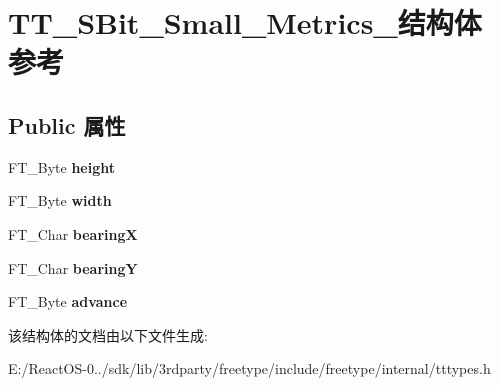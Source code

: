 \hypertarget{struct_t_t___s_bit___small___metrics__}{}\section{T\+T\+\_\+\+S\+Bit\+\_\+\+Small\+\_\+\+Metrics\+\_\+结构体 参考}
\label{struct_t_t___s_bit___small___metrics__}
\subsection*{Public 属性}
\begin{DoxyCompactItemize}
\item 
\mbox{\label{struct_t_t___s_bit___small___metrics___aecc44b5e504d5ce27521505ed53420c8}} 
F\+T\+\_\+\+Byte {\bfseries height}
\item 
\mbox{\label{struct_t_t___s_bit___small___metrics___ad2401ae208b1663d0085ca06a04885fe}} 
F\+T\+\_\+\+Byte {\bfseries width}
\item 
\mbox{\label{struct_t_t___s_bit___small___metrics___a4361ae83a66706852c0c7d4c4ddff9c2}} 
F\+T\+\_\+\+Char {\bfseries bearingX}
\item 
\mbox{\label{struct_t_t___s_bit___small___metrics___aba8cbfd6203f4083b8fb305f88d6d1fc}} 
F\+T\+\_\+\+Char {\bfseries bearingY}
\item 
\mbox{\label{struct_t_t___s_bit___small___metrics___a056c5ea71ec3339ca9b7356ea7c90e37}} 
F\+T\+\_\+\+Byte {\bfseries advance}
\end{DoxyCompactItemize}


该结构体的文档由以下文件生成\+:\begin{DoxyCompactItemize}
\item 
E\+:/\+React\+O\+S-\/0../sdk/lib/3rdparty/freetype/include/freetype/internal/tttypes.\+h\end{DoxyCompactItemize}

